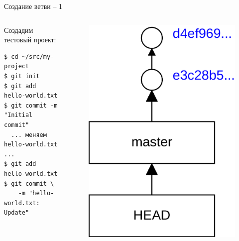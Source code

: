 \documentclass[presentation]{beamer}
\begin{document}

\begin{frame}[fragile]{Создание ветви -- 1}
  \begin{columns}
    \begin{column}{.6\textwidth}
      Создадим тестовый проект: \newline
\begin{verbatim}
$ cd ~/src/my-project
$ git init
$ git add hello-world.txt
$ git commit -m "Initial commit"
  ... меняем hello-world.txt ...
$ git add hello-world.txt
$ git commit \
    -m "hello-world.txt: Update"
\end{verbatim}
      \end{column}
      \begin{column}{.4\textwidth}
        \begin{figure}[htb]
          \centering
          \includegraphics[height=.7\textheight]{git-basics-1}
        \end{figure}
      \end{column}
    \end{columns}
\end{frame}
\end{document}
